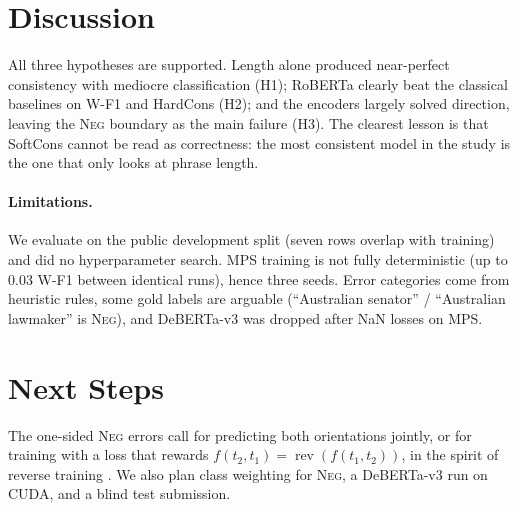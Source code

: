 \documentclass[11pt,a4paper]{article}
\newcommand{\NEG}{\textsc{Neg}}
\DeclareMathOperator{\rev}{rev}
\begin{document}
\section{Discussion}
\label{sec:discussion}

All three hypotheses are supported. Length alone produced near-perfect consistency with mediocre classification (H1); RoBERTa clearly beat the classical baselines on W-F1 and HardCons (H2); and the encoders largely solved direction, leaving the \NEG{} boundary as the main failure (H3). The clearest lesson is that SoftCons cannot be read as correctness: the most consistent model in the study is the one that only looks at phrase length.

\paragraph{Limitations.} We evaluate on the public development split (seven rows overlap with training) and did no hyperparameter search. MPS training is not fully deterministic (up to 0.03 W-F1 between identical runs), hence three seeds. Error categories come from heuristic rules, some gold labels are arguable (``Australian senator'' / ``Australian lawmaker'' is \NEG), and DeBERTa-v3 was dropped after NaN losses on MPS.

\section{Next Steps}
\label{sec:next}

The one-sided \NEG{} errors call for predicting both orientations jointly, or for training with a loss that rewards $f(t_2,t_1)=\rev(f(t_1,t_2))$, in the spirit of reverse training \citep{golovneva2024reverse}. We also plan class weighting for \NEG, a DeBERTa-v3 run on CUDA, and a blind test submission.



\end{document}
